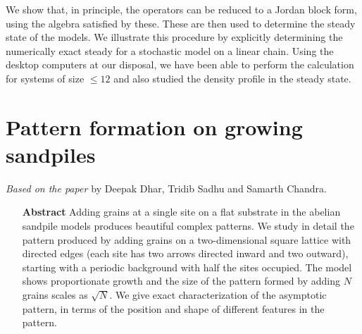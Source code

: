 \documentclass[11pt,a4paper]{book}
\begin{document}
\begin{itemize}
{We show that, in principle, the operators can be reduced to a Jordan
block form, using the algebra satisfied by these.  These are then used
to determine the steady state of the models. We illustrate this
procedure by explicitly determining the numerically exact steady for
a stochastic model on a linear chain. Using the desktop computers at
our disposal, we have been able to perform the calculation for systems
of size $\le 12$ and also studied the density profile in the steady
state. }


\end{itemize}
\chapter{Pattern formation on growing sandpiles}\label{ch2}
\textit{Based on the paper \cite{myepl}} by Deepak Dhar, Tridib Sadhu and Samarth
Chandra.

\begin{itemize}\item[\textbf{Abstract}]{\small{
Adding grains at a single site on a flat substrate in the abelian 
sandpile models produces beautiful complex patterns. We study in detail 
the pattern produced by adding grains on a two-dimensional square 
lattice with directed edges (each site has two arrows directed inward 
and two outward), starting with a periodic background with half the 
sites occupied.  The model shows proportionate growth and the size of the pattern formed by adding $N$ 
grains scales as $\sqrt{N}$.  We give exact 
characterization of the asymptotic pattern, in terms of the position
and shape of different features in the pattern.}
}
\end{itemize}
\end{document}
